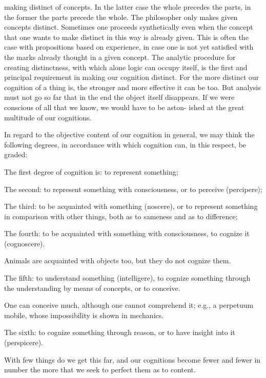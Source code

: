     making distinct of concepts. In the latter case the whole precedes the parts,
    in the former the parts precede the whole. The philosopher only makes given
    concepts distinct.
    Sometimes one proceeds synthetically even when the
    concept that one wants to make distinct in this way is already given.
    This is often the case with propositions based on experience,
    in case one is not yet satisfied with
    the marks already thought in a given concept.
    The analytic procedure for creating distinctness, with which alone logic
    can occupy itself, is the first and principal requirement in making our
    cognition distinct.
    For the more distinct our cognition of a thing is, the
    stronger and more effective it can be too.
    But analysis must not go so far
    that in the end the object itself disappears.
    If we were conscious of all that we know, we would have to be aston-
    ished at the great multitude of our cognitions.

    In regard to the objective content of our cognition in general,
    we may think the following degrees, in accordance with which
    cognition can, in this respect, be graded:

    The first degree of cognition is: to represent something;

    The second: to represent something with consciousness,
    or to perceive (percipere);

    The third: to be acquainted with something (noscere), or
    to represent something in comparison with other things,
    both as to sameness and as to difference;

    The fourth: to be acquainted with something with consciousness,
    to cognize it (cognoscere).

    Animals are acquainted with objects too,
    but they do not cognize them.

    The fifth: to understand something (intelligere),
    to cognize something through the understanding
    by means of concepts,
    or to conceive.

    One can conceive much, although one cannot comprehend it;
    e.g., a perpetuum mobile, whose impossibility is shown in mechanics.

    The sixth: to cognize something through reason, or
    to have insight into it (perspicere).

    With few things do we get this far,
    and our cognitions become fewer and fewer in number
    the more that we seek to perfect them as to content.

